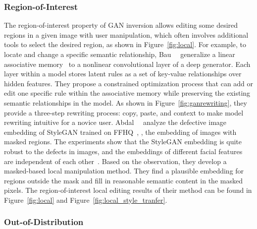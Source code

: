 \fignoninference

\figrewrite

\subsubsection{Region-of-Interest}
\label{sec:local}


The region-of-interest property of GAN inversion allows editing some desired regions in a given image with user manipulation, which often involves additional tools to select the desired region, as shown in Figure~\ref{fig:local}.
For example, to locate and change a specific semantic relationship, Bau~\etal~\cite{bau2020rewriting} generalize a linear associative memory~\cite{kohonen1973matrix} to a nonlinear convolutional layer of a deep generator. 
Each layer within a model stores latent rules as a set of key-value relationships over hidden features.
They propose a constrained optimization process that can add or edit one specific rule within the associative memory while preserving the existing semantic relationships in the model.
As shown in Figure~\ref{fig:ganrewriting}, 
they provide a three-step rewriting process: copy, paste, and context to make model rewriting intuitive for a novice user. 
Abdal~\etal~\cite{abdal2019image2stylegan,abdal2020image2stylegan2} analyze the defective image embedding of StyleGAN trained on FFHQ~\cite{karras2019style}, \ie, the embedding of images with masked regions.
The experiments show that the StyleGAN embedding is quite robust to the defects in images, and the embeddings of different facial features are independent of each other~\cite{abdal2019image2stylegan}. 
Based on the observation, they develop a masked-based local manipulation method.
They find a plausible embedding for regions outside the mask and fill in reasonable semantic content in the masked pixels. 
The region-of-interest local editing results of their method can be found in Figure~\ref{fig:local} and Figure~\ref{fig:local_style_tranfer}.

\figroi

\subsubsection{Out-of-Distribution}
\label{sec:ood}


